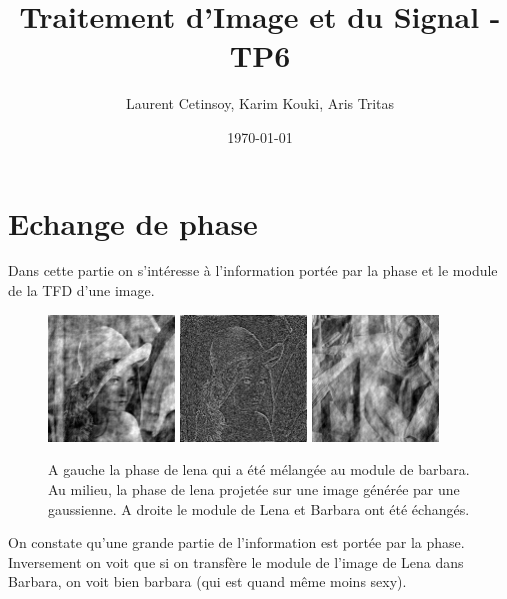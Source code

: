 \documentclass{article}
\title{Traitement d'Image et du Signal - TP6}
\author{Laurent Cetinsoy, Karim Kouki, Aris Tritas }
\date{\today}
\begin{document}
\maketitle

\section{Echange de phase}

Dans cette partie on s'intéresse à l'information portée par la phase et le module de la TFD d'une image. 


\begin{figure}[h]
	\includegraphics[width=0.3\textwidth]{phase_swapping.jpg}
	\includegraphics[width=0.3\textwidth]{phase_swapping_in_random.jpg}
	\includegraphics[width=0.3\textwidth]{module_swapping.jpg}

  \caption{A gauche la phase de lena qui a été mélangée au module de barbara. Au milieu, la phase de lena projetée sur une image générée par une gaussienne. A droite le module de Lena et Barbara ont été échangés.}
\end{figure}

On constate qu'une grande partie de l'information est portée par la phase. Inversement on voit que si on transfère le module de l'image de Lena dans Barbara, on voit bien barbara (qui est quand même moins sexy). 
\end{document}
